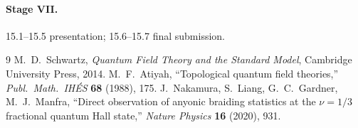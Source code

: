 \documentclass[11pt]{article}
\begin{document}
\paragraph{Stage VII.} 15.1--15.5 presentation; 15.6--15.7 final submission.

\begin{thebibliography}{9}
M.~D.~Schwartz, \emph{Quantum Field Theory and the Standard Model}, Cambridge University
Press, 2014.
M.~F.~Atiyah, ``Topological quantum field theories,'' \emph{Publ.\ Math.\ IH\'ES}
\textbf{68} (1988), 175.
J.~Nakamura, S.~Liang, G.~C.~Gardner, M.~J.~Manfra, ``Direct observation of anyonic
braiding statistics at the $\nu=1/3$ fractional quantum Hall state,'' \emph{Nature Physics}
\textbf{16} (2020), 931.
\end{thebibliography}
\end{document}
